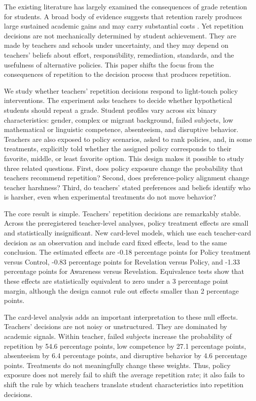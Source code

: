 \documentclass[12pt,a4paper]{article}
\begin{document}
The existing literature has largely examined the consequences of grade retention for students. A broad body of evidence suggests that retention rarely produces large sustained academic gains and may carry substantial costs \citep{allen2009,alet2013,cabrera2022}. Yet repetition decisions are not mechanically determined by student achievement. They are made by teachers and schools under uncertainty, and they may depend on teachers' beliefs about effort, responsibility, remediation, standards, and the usefulness of alternative policies. This paper shifts the focus from the consequences of repetition to the decision process that produces repetition.

We study whether teachers' repetition decisions respond to light-touch policy interventions. The experiment asks teachers to decide whether hypothetical students should repeat a grade. Student profiles vary across six binary characteristics: gender, complex or migrant background, failed subjects, low mathematical or linguistic competence, absenteeism, and disruptive behavior. Teachers are also exposed to policy scenarios, asked to rank policies, and, in some treatments, explicitly told whether the assigned policy corresponds to their favorite, middle, or least favorite option. This design makes it possible to study three related questions. First, does policy exposure change the probability that teachers recommend repetition? Second, does preference-policy alignment change teacher harshness? Third, do teachers' stated preferences and beliefs identify who is harsher, even when experimental treatments do not move behavior?

The core result is simple. Teachers' repetition decisions are remarkably stable. Across the preregistered teacher-level analyses, policy treatment effects are small and statistically insignificant. New card-level models, which use each teacher-card decision as an observation and include card fixed effects, lead to the same conclusion. The estimated effects are -0.18 percentage points for Policy treatment versus Control, -0.83 percentage points for Revelation versus Policy, and -1.33 percentage points for Awareness versus Revelation. Equivalence tests show that these effects are statistically equivalent to zero under a 3 percentage point margin, although the design cannot rule out effects smaller than 2 percentage points.

The card-level analysis adds an important interpretation to these null effects. Teachers' decisions are not noisy or unstructured. They are dominated by academic signals. Within teacher, failed subjects increase the probability of repetition by 54.6 percentage points, low competence by 27.1 percentage points, absenteeism by 6.4 percentage points, and disruptive behavior by 4.6 percentage points. Treatments do not meaningfully change these weights. Thus, policy exposure does not merely fail to shift the average repetition rate; it also fails to shift the rule by which teachers translate student characteristics into repetition decisions.
\end{document}
